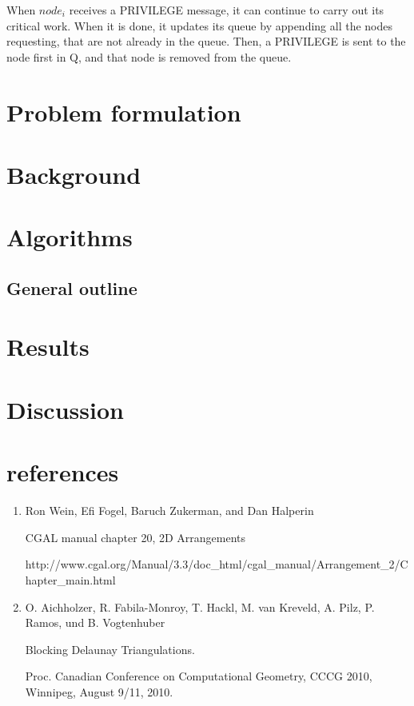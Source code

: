 \documentclass[a4paper,12pt]{article}
\begin{document}
When $node_i$ receives a PRIVILEGE message, it can continue to carry out its critical work. When it is done, it updates its queue by appending all the nodes requesting, that are not already in the queue. Then, a PRIVILEGE is sent to the node first in Q, and that node is removed from the queue.

\section{Problem formulation}

\section{Background}

\section{Algorithms}

\subsection{General outline}

\section{Results}


\section{Discussion}



\section{references}
\small
\begin{enumerate}
\item
\label{ref:cgal}
Ron Wein, Efi Fogel, Baruch Zukerman, and Dan Halperin

CGAL manual chapter 20, 2D Arrangements

http://www.cgal.org/Manual/3.3/doc\_html/cgal\_manual/Arrangement\_2/Chapter\_main.html

\item
\label{ref:blocking}
O. Aichholzer, R. Fabila-Monroy, T. Hackl, M. van Kreveld, A. Pilz, P. Ramos, und B. Vogtenhuber

Blocking Delaunay Triangulations. 

Proc. Canadian Conference on Computational Geometry, CCCG 2010, Winnipeg, August 9/11, 2010. 

\end{enumerate}
\end{document}
